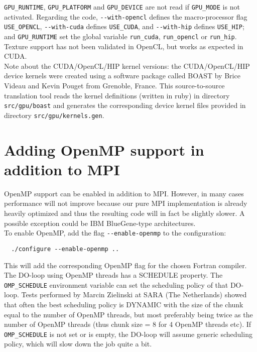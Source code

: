 \texttt{GPU\_RUNTIME}, \texttt{GPU\_PLATFORM} and \texttt{GPU\_DEVICE}
are not read if \texttt{GPU\_MODE} is not activated.
Regarding the code, \texttt{-{}-with-opencl} defines the
macro-processor flag \texttt{USE\_OPENCL}, \texttt{-{}-with-cuda}
defines \texttt{USE\_CUDA}, and \texttt{-{}-with-hip}
defines \texttt{USE\_HIP}; and \texttt{GPU\_RUNTIME} set the global
variable \texttt{run\_cuda}, \texttt{run\_opencl} or \texttt{run\_hip}.
Texture support has not been validated in OpenCL, but works as
expected in CUDA.\\


Note about the CUDA/OpenCL/HIP kernel versions: the CUDA/OpenCL/HIP device kernels were
created using a software package called BOAST \citep{Videau2013} by Brice Videau and Kevin Pouget from Grenoble, France.
This source-to-source translation tool reads the kernel definitions (written in ruby) in directory \texttt{src/gpu/boast}
and generates the corresponding device kernel files provided in directory \texttt{src/gpu/kernels.gen}.


\section{Adding OpenMP support in addition to MPI}

OpenMP support can be enabled in addition to MPI. However, in many
cases performance will not improve because our pure MPI implementation
is already heavily optimized and thus the resulting code will in fact
be slightly slower. A possible exception could be IBM BlueGene-type
architectures.\\


\noindent
To enable OpenMP,  add the flag \texttt{-{}-enable-openmp} to the configuration:
{\small
\begin{verbatim}
  ./configure --enable-openmp ..
\end{verbatim}
}
\noindent
This will add the corresponding OpenMP flag for the chosen Fortran compiler.\\


The DO-loop using OpenMP threads has a SCHEDULE property. The \texttt{OMP\_SCHEDULE}
environment variable can set the scheduling policy of that DO-loop.
Tests performed by Marcin Zielinski at SARA (The Netherlands) showed
that often the best scheduling policy is DYNAMIC with the size of
the chunk equal to the number of OpenMP threads, but most preferably
being twice as the number of OpenMP threads (thus chunk size = 8 for
4 OpenMP threads etc). If \texttt{OMP\_SCHEDULE} is not set or is empty, the
DO-loop will assume generic scheduling policy, which will slow down
the job quite a bit.



